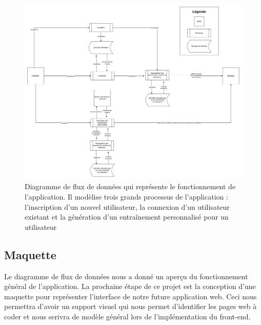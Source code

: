 \documentclass[french]{article}
\begin{document}
    \newpage
    \begin{figure}[h!]
        \includegraphics[width=15cm]{dataflow_e4}
        \centering
        \caption{Diagramme de flux de données qui représente le fonctionnement de l'application. Il modèlise trois grands processus de l'application : l'inscription d'un nouvel utilisateur, la connexion d'un utilisateur existant et la génération d'un entraînement personnalisé pour un utilisateur}
        \centering
    \end{figure}
    \subsection{Maquette}
    Le diagramme de flux de données nous a donné un aperçu du fonctionnement général de l'application. La prochaine étape de ce projet est la conception d'une maquette pour représenter l'interface de notre future application web. Ceci nous permettra d'avoir un support visuel qui nous permet d'identifier les pages web à coder et nous serivra de modèle général lors de l'implémentation du front-end. 
    
\end{document}
